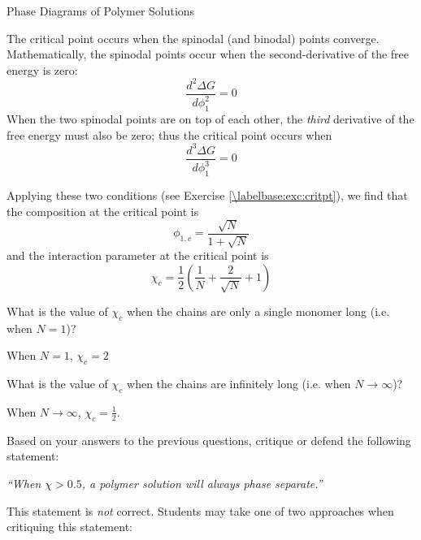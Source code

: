 \begin{activity}{Phase Diagrams of Polymer Solutions}
\begin{infobox}
	The critical point occurs when the spinodal (and binodal) points converge.  Mathematically, the spinodal points occur when the second-derivative of the free energy is zero:
	\begin{equation*}
		\frac{d^2\Delta G}{d\phi_1^2} = 0
	\end{equation*}
	When the two spinodal points are on top of each other, the \emph{third} derivative of the free energy must also be zero; thus the critical point occurs when 
	\begin{equation*}
		\frac{d^3\Delta G}{d\phi_1^3} = 0
	\end{equation*}
	
	Applying these two conditions (see Exercise \ref{\labelbase:exc:critpt}), we find that the composition at the critical point is
	\begin{equation*}
		\phi_{1,c} = \frac{\sqrt{N}}{1+\sqrt{N}}
		\label{\labelbase:eqn:phi1c}
	\end{equation*}
	and the interaction parameter at the critical point is
	\begin{equation*}
		\chi_c = \frac{1}{2}\left(\frac{1}{N} + \frac{2}{\sqrt{N}} + 1\right)
		\label{\labelbase:eqn:chic}
	\end{equation*}
	
\end{infobox}



\begin{ctqs}
	
	\question What is the value of $\chi_c$ when the chains are only a single monomer long (i.e. when $N=1$)?
	
		\begin{solution}[0.75in]{}
			When $N=1$, $\chi_c = 2$
		\end{solution}
	
	\question What is the value of $\chi_c$ when the chains are infinitely long (i.e. when $N\to\infty$)?	
	
		\begin{solution}[0.75in]{}
			When $N\to\infty$, $\chi_c = \frac{1}{2}$.
		\end{solution}
	
	\question Based on your answers to the previous questions, critique or defend the following statement:
	
		\emph{``When $\chi > 0.5$, a polymer solution will always phase separate.'' }
	
		\begin{solution}[2.5in]{}
			This statement is \emph{not} correct.  Students may take one of two approaches when critiquing this statement:
			

\end{solution}
\end{ctqs}
\end{activity}
